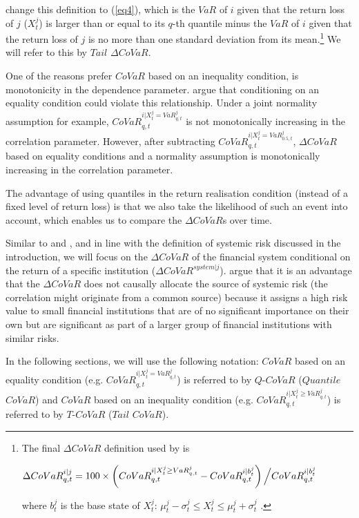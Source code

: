 \documentclass[12pt]{article}
\begin{document}
\citet{girardi} change this definition to (\ref{eq4}), which is the $VaR$ of $i$ given that the return loss of $j$ ($X^j_t$) is larger than or equal to its $q$-th quantile minus the $VaR$ of $i$ given that the return loss of $j$ is no more than one standard deviation from its mean.\footnote{The final $\Delta CoVaR$ definition used by \citet{girardi} is

$\Delta CoVaR^{i|j}_{q,t} = 100 \times \left( CoVaR_{q,t}^{i|X^{j}_t\geq VaR_{q,t}^{j}}-CoVaR_{q,t}^{i|b^j_t} \right) \left/ CoVaR_{q,t}^{i|b^j_t} \right. $

where $b^j_t$ is the base state of $X^j_t$: $\mu^j_t-\sigma^j_t \leq X^{j}_t \leq \mu^j_t+\sigma^j_t$ .  } We will refer to this by $Tail$ $\Delta CoVaR$.

One of the reasons \citet{girardi} prefer $CoVaR$ based on an inequality condition, is monotonicity in the dependence parameter. \citet{copulas} argue that conditioning on an equality condition could violate this relationship. Under a joint normality assumption for example, $CoVaR_{q,t}^{i|X^{j}_t=VaR_{q,t}^{j}}$ is not monotonically increasing in the correlation parameter. However, after subtracting $CoVaR_{q,t}^{i|X^{j}_t=VaR_{0.5,t}^{j}}$, $\Delta CoVaR$ based on equality conditions and a normality assumption is monotonically increasing in the correlation parameter.

The advantage of using quantiles in the return realisation condition (instead of a fixed level of return loss) is that we also take the likelihood of such an event into account, which enables us to compare the $\Delta CoVaR$s over time.

Similar to \citet{adrian} and \citet{girardi}, and in line with the definition of systemic risk discussed in the introduction, we will focus on the $\Delta CoVaR$ of the financial system conditional on the return of a specific institution ($\Delta CoVaR^{system|j}$).  \citet{adrian} argue that it is an advantage that the $\Delta CoVaR$ does not causally allocate the source of systemic risk (the correlation might originate from a common source) because it assigns a high risk value to small financial institutions that are of no significant importance on their own but are significant as part of a larger group of  financial institutions with similar risks.

In the following sections, we will use the following notation: $CoVaR$ based on an equality condition (e.g. $CoVaR_{q,t}^{i|X^{j}_t=VaR_{q,t}^{j}}$) is referred to by $Q$-$CoVaR$ ($Quantile$ $CoVaR$) and $CoVaR$ based on an inequality condition (e.g. $CoVaR_{q,t}^{i|X^{j}_t\geq VaR_{q,t}^{j}}$) is referred to by $T$-$CoVaR$ ($Tail$ $CoVaR$).
\end{document}
